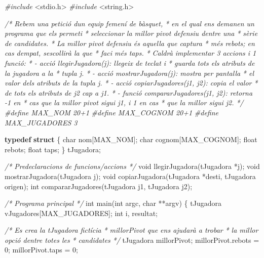 \documentclass[
]{book}
\newenvironment{Shaded}{\begin{snugshade}}{\end{snugshade}}
\newcommand{\CommentTok}[1]{\textcolor[rgb]{0.56,0.35,0.01}{\textit{#1}}}
\newcommand{\DataTypeTok}[1]{\textcolor[rgb]{0.13,0.29,0.53}{#1}}
\newcommand{\DecValTok}[1]{\textcolor[rgb]{0.00,0.00,0.81}{#1}}
\newcommand{\ImportTok}[1]{#1}
\newcommand{\KeywordTok}[1]{\textcolor[rgb]{0.13,0.29,0.53}{\textbf{#1}}}
\newcommand{\NormalTok}[1]{#1}
\newcommand{\PreprocessorTok}[1]{\textcolor[rgb]{0.56,0.35,0.01}{\textit{#1}}}
\begin{document}
\begin{Shaded}
\begin{Highlighting}[]
\PreprocessorTok{\#include }\ImportTok{\textless{}stdio.h\textgreater{}}
\PreprocessorTok{\#include }\ImportTok{\textless{}string.h\textgreater{}}

\CommentTok{/* Rebem una petició d\textquotesingle{}un equip femení de bàsquet,}
\CommentTok{ * en el qual ens demanen un programa que els permeti}
\CommentTok{ * seleccionar la millor pivot defensiu d\textquotesingle{}entre una }
\CommentTok{ * sèrie de candidates.}
\CommentTok{ * La millor pivot defensiu és aquella que captura}
\CommentTok{ * més rebots; en cas d\textquotesingle{}empat, s\textquotesingle{}escollirà la que}
\CommentTok{ * faci més taps.}
\CommentTok{ * Caldrà implementar 3 accions i 1 funció:}
\CommentTok{ * {-} acció llegirJugadora(j): llegeix de teclat i}
\CommentTok{ *   guarda tots els atributs de la jugadora a la}
\CommentTok{ *   tupla j.}
\CommentTok{ * {-} acció mostrarJugadora(j): mostra per pantalla}
\CommentTok{ *   el valor dels atributs de la tupla j.}
\CommentTok{ * {-} acció copiarJugadores(j1, j2): copia el valor}
\CommentTok{ *   de tots els atributs de j2 cap a j1.}
\CommentTok{ * {-} funció compararJugadores(j1, j2): retorna {-}1 en }
\CommentTok{ *   cas que la millor pivot sigui j1, i 1 en cas }
\CommentTok{ *   que la millor sigui j2.}
\CommentTok{ */}
\PreprocessorTok{\#define MAX\_NOM 20+1}
\PreprocessorTok{\#define MAX\_COGNOM 20+1}
\PreprocessorTok{\#define MAX\_JUGADORES 3}

\KeywordTok{typedef} \KeywordTok{struct}\NormalTok{ \{}
    \DataTypeTok{char}\NormalTok{ nom[MAX\_NOM];}
    \DataTypeTok{char}\NormalTok{ cognom[MAX\_COGNOM];}
    \DataTypeTok{float}\NormalTok{ rebots;}
    \DataTypeTok{float}\NormalTok{ taps;}
\NormalTok{\} tJugadora;}

\CommentTok{/* Predeclaracions de funcions/accions */}
\DataTypeTok{void}\NormalTok{ llegirJugadora(tJugadora *j);}
\DataTypeTok{void}\NormalTok{ mostrarJugadora(tJugadora j);}
\DataTypeTok{void}\NormalTok{ copiarJugadora(tJugadora *desti, tJugadora origen);}
\DataTypeTok{int}\NormalTok{ compararJugadores(tJugadora j1, tJugadora j2);}

\CommentTok{/* Programa principal */}
\DataTypeTok{int}\NormalTok{ main(}\DataTypeTok{int}\NormalTok{ argc, }\DataTypeTok{char}\NormalTok{ **argv) \{}
\NormalTok{    tJugadora vJugadores[MAX\_JUGADORES];}
    \DataTypeTok{int}\NormalTok{ i, resultat;}

    \CommentTok{/* Es crea la tJugadora fictícia }
\CommentTok{     * millorPivot que ens ajudarà a trobar }
\CommentTok{     * la millor opció d\textquotesingle{}entre totes les }
\CommentTok{     * candidates}
\CommentTok{     */}
\NormalTok{    tJugadora millorPivot; }
\NormalTok{    millorPivot.rebots = }\DecValTok{0}\NormalTok{;}
\NormalTok{    millorPivot.taps = }\DecValTok{0}\NormalTok{;}


\end{Highlighting}
\end{Shaded}
\end{document}
